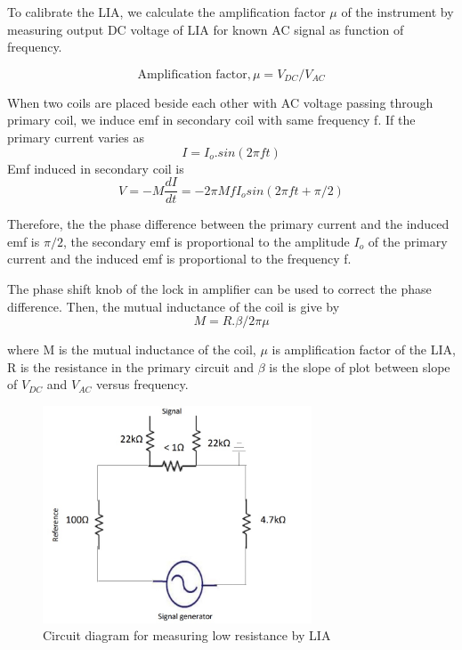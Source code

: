 \documentclass[a4paper, amsfonts, amssymb, amsmath, reprint, showkeys, nofootinbib, twoside]{revtex4-1}
\begin{document}
To calibrate the LIA, we calculate the amplification factor $\mu$ of the instrument by measuring output DC voltage of LIA for known AC signal as function of frequency.

\begin{equation}
	 \text{Amplification factor}, \mu=V_{DC}/V_{AC}
\end{equation}

When two coils are placed beside each other with AC voltage passing through primary coil, we induce emf in secondary coil with same frequency f. If the primary current varies as 
\begin{equation}
	I=I_o.sin(2\pi f t)
\end{equation}
Emf induced in secondary coil is 
\begin{equation}
	V=-M\frac{dI}{dt}=-2\pi M f I_o sin(2 \pi f t+\pi/2 )
\end{equation}

Therefore, the the phase difference between the primary current and the induced emf is $\pi/2$, the secondary emf is proportional to the amplitude $I_o$ of the primary current and the induced emf is proportional to the frequency f. 

The phase shift knob of the lock in amplifier can be used
to correct the phase difference. Then, the mutual inductance of the coil is give by
\begin{equation}
	M=R.\beta  /2 \pi \mu
\end{equation}

where M is the mutual inductance of the coil, $\mu$ is 
amplification factor of the LIA, R is the resistance in the primary circuit and $\beta$ is the slope of plot between slope of $V_{DC}$ and $V_{AC}$ versus frequency.

\begin{figure}[H]
	\centering
	\includegraphics[width=8cm]{f3} 
	\caption{Circuit diagram for measuring low resistance by LIA}
	\label{f3}
\end{figure}
\end{document}

